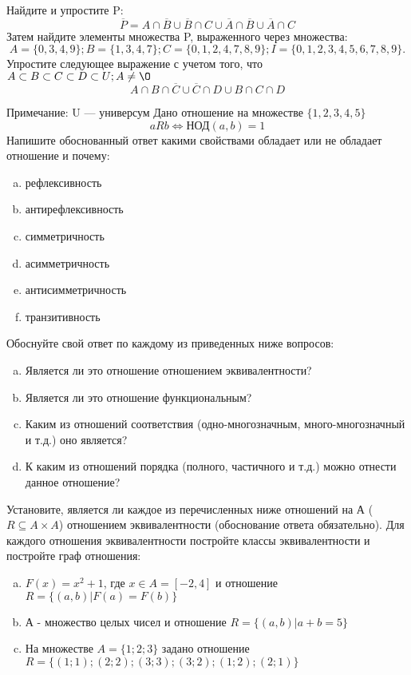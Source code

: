 \documentclass[10pt]{exam}
\begin{document}
\begin{questions}
\question
Найдите и упростите P:
\begin{equation*}
\overline{P} = A \cap \overline{B} \cup \overline{B} \cap C \cup \overline{A} \cap \overline{B} \cup \overline{A} \cap C
\end{equation*}
Затем найдите элементы множества P, выраженного через множества:
\begin{equation*}
A = \{0, 3, 4, 9\}; 
B = \{1, 3, 4, 7\};
C = \{0, 1, 2, 4, 7, 8, 9\};
I = \{0, 1, 2, 3, 4, 5, 6, 7, 8, 9\}.
\end{equation*}\question
Упростите следующее выражение с учетом того, что $A\subset B \subset C \subset D \subset U; A \neq \O$
\begin{equation*}
A \cap B  \cap \overline{C} \cup \overline{C} \cap D \cup B \cap C \cap D
\end{equation*}

Примечание: U — универсум\question
Дано отношение на множестве $\{1, 2, 3, 4, 5\}$ 
\begin{equation*}
aRb \iff  \text{НОД}(a,b) =1
\end{equation*}
Напишите обоснованный ответ какими свойствами обладает или не обладает отношение и почему:   
\begin{enumerate} [a)]\setcounter{enumi}{0}
\item рефлексивность
\item антирефлексивность
\item симметричность
\item асимметричность
\item антисимметричность
\item транзитивность
\end{enumerate}

Обоснуйте свой ответ по каждому из приведенных ниже вопросов:
\begin{enumerate} [a)]\setcounter{enumi}{0}
    \item Является ли это отношение отношением эквивалентности?
    \item Является ли это отношение функциональным?
    \item Каким из отношений соответствия (одно-многозначным, много-многозначный и т.д.) оно является?
    \item К каким из отношений порядка (полного, частичного и т.д.) можно отнести данное отношение?
\end{enumerate}


\question
Установите, является ли каждое из перечисленных ниже отношений на А ($R \subseteq A \times A$) отношением эквивалентности (обоснование ответа обязательно). Для каждого отношения эквивалентности постройте классы эквивалентности и постройте граф отношения:
\begin{enumerate} [a)]\setcounter{enumi}{0}
\item $F(x)=x^{2}+1$, где $x \in A = [-2, 4]$ и отношение $R = \{(a,b)|F(a) = F(b)\}$
\item А - множество целых чисел и отношение $R = \{(a,b)|a + b = 5\}$
\item На множестве $A = \{1; 2; 3\}$ задано отношение $R = \{(1; 1); (2; 2); (3; 3); (3; 2); (1; 2); (2; 1)\}$


\end{enumerate}
\end{questions}
\end{document}
